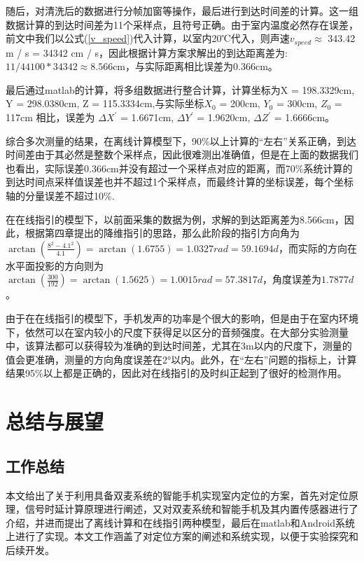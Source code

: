 \documentclass[winfonts]{njuthesis}
\begin{document}
		随后，对清洗后的数据进行分帧加窗等操作，最后进行到达时间差的计算。这一组数据计算的到达时间差为11个采样点，且符号正确。由于室内温度必然存在误差，前文中我们以公式(\ref{v_speed})代入计算，以室内20℃代入，则声速$v_{speed} \approx $ 343.42 m / s = 34342 cm / s，因此根据计算方案求解出的到达距离差为: $11 / 44100 * 34342 \approx 8.566$cm，与实际距离相比误差为0.366cm。
		
		最后通过matlab的计算，将多组数据进行整合计算，计算坐标为X = 198.3329cm, Y = 298.0380cm, Z = 115.3334cm,与实际坐标$X_0 $ = 200cm, $Y_0 $ = 300cm, $Z_0 $ = 117cm 相比，误差为 $\Delta X^{'}$ = 1.6671cm, $\Delta Y^{'}$ = 1.9620cm, $\Delta Z^{'}$ = 1.6666cm。
		
		综合多次测量的结果，在离线计算模型下，90\%以上计算的“左右”关系正确，到达时间差由于其必然是整数个采样点，因此很难测出准确值，但是在上面的数据我们也看出，实际误差0.366cm并没有超过一个采样点对应的距离，而70\%系统计算的到达时间点采样值误差也并不超过1个采样点，而最终计算的坐标误差，每个坐标轴的分量误差不超过10\%.
		
		
		在在线指引的模型下，以前面采集的数据为例，求解的到达距离差为8.566cm，因此，根据第四章提出的降维指引的思路，那么此阶段的指引方向角为$\arctan(\frac{8^2-4.1^2}{4.1}) = \arctan(1.6755) = 1.0327 rad = 59.1694 d$，而实际的方向在水平面投影的方向则为$\arctan(\frac{300}{192}) = \arctan(1.5625) = 1.0015 rad = 57.3817 d$，角度误差为$1.7877 d$。
		
		由于在在线指引的模型下，手机发声的功率是个很大的影响，但是由于在室内环境下，依然可以在室内较小的尺度下获得足以区分的音频强度。在大部分实验测量中，该算法都可以获得较为准确的到达时间差，尤其在3m以内的尺度下，测量的值会更准确，测量的方向角度误差在2°以内。此外，在“左右”问题的指标上，计算结果95\%以上都是正确的，因此对在线指引的及时纠正起到了很好的检测作用。	
		
		
\chapter{总结与展望}
	\section{工作总结}
		
		本文给出了关于利用具备双麦系统的智能手机实现室内定位的方案，首先对定位原理，信号时延计算原理进行阐述，又对双麦系统和智能手机及其内置传感器进行了介绍，并进而提出了离线计算和在线指引两种模型，最后在matlab和Android系统上进行了实现。本文工作涵盖了对定位方案的阐述和系统实现，以便于实验探究和后续开发。
	
\end{document}
